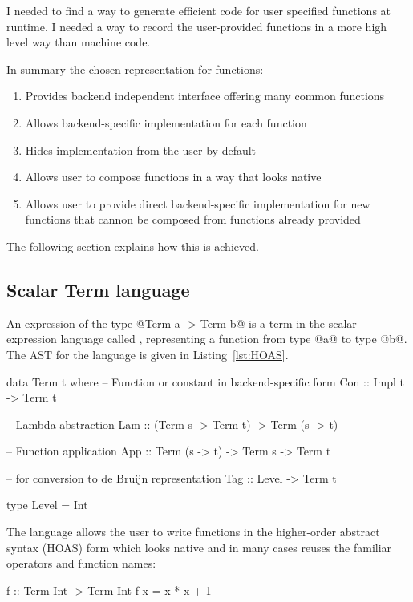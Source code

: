 \documentclass[preamble.tex]{subfiles}
\begin{document}
I needed to find a way to generate efficient code for user specified functions at runtime. I needed a way to record the user-provided functions in a more high level way than machine code.

In summary the chosen representation for functions:
\begin{enumerate}
\item Provides backend independent interface offering many common functions
\item Allows backend-specific implementation for each function
\item Hides implementation from the user by default
\item Allows user to compose functions in a way that looks native
\item Allows user to provide direct backend-specific implementation for new functions that cannon be composed from functions already provided
\end{enumerate}

The following section explains how this is achieved.


\subsection{Scalar Term language}

An expression of the type @Term a -> Term b@ is a term in the scalar expression language called , representing a function from type @a@ to type @b@. The AST for the  language is given in Listing~\ref{lst:HOAS}.

\begin{hscode2}[%
    caption={Term language for HOAS representation.},%
    label=lst:HOAS,%
]
data Term t where
  -- Function or constant in backend-specific form
  Con :: Impl t -> Term t

  -- Lambda abstraction
  Lam :: (Term s -> Term t) -> Term (s -> t)

  -- Function application
  App :: Term (s -> t) -> Term s -> Term t

  -- for conversion to de Bruijn representation
  Tag :: Level -> Term t

type Level = Int
\end{hscode2}

The language allows the user to write functions in the higher-order abstract syntax (HOAS) form which looks native and in many cases reuses the familiar operators and function names:

\begin{hscode}
f :: Term Int -> Term Int
f x = x * x + 1
\end{hscode}
\end{document}
